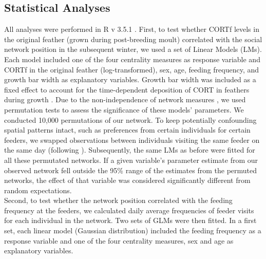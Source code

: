 \documentclass[10pt, twoside]{book} %
\begin{document}
	
	\subsection*{Statistical Analyses}
	
All analyses were performed in R v 3.5.1 \citep{RCoreTeam2018}. First, to test whether CORTf levels in the original feather (grown during post-breeding moult) correlated with the social network position in the subsequent winter, we used a set of Linear Models (LMs). Each model included one of the four centrality measures as response variable and CORTf in the original feather (log-transformed), sex, age, feeding frequency, and growth bar width as explanatory variables. Growth bar width was included as a fixed effect to account for the time-dependent deposition of CORT in feathers during growth \citep{Bortolotti2010, Jenni-Eiermann2015, Romero2016}. Due to the non-independence of network measures \citep{Farine2015, Farine2017}, we used permutation tests to assess the significance of these models' parameters. We conducted 10,000 permutations of our network. To keep potentially confounding spatial patterns intact, such as preferences from certain individuals for certain feeders, we swapped observations between individuals visiting the same feeder on the same day (following \citealt{Moyers2018}). Subsequently, the same LMs as before were fitted for all these permutated networks. If a given variable's parameter estimate from our observed network fell outside the 95\% range of the estimates from the permuted networks, the effect of that variable was considered significantly different from random expectations.\\

Second, to test whether the network position correlated with the feeding frequency at the feeders, we calculated daily average frequencies of feeder visits for each individual in the network. Two sets of GLMs were then fitted. In a first set, each linear model (Gaussian distribution) included the feeding frequency as a response variable and one of the four centrality measures, sex and age as explanatory variables.\\
\end{document}

